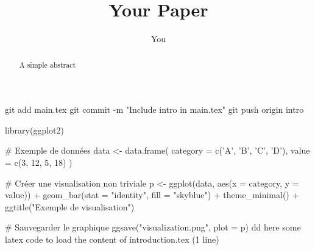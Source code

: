 \documentclass{article}
\title{Your Paper}
\author{You}
\begin{document}
\maketitle
\begin{abstract}
A simple abstract
\end{abstract}

git add main.tex
git commit -m "Include intro in main.tex"
git push origin intro


library(ggplot2)

# Exemple de données
data <- data.frame(
  category = c('A', 'B', 'C', 'D'),
  value = c(3, 12, 5, 18)
)

# Créer une visualisation non triviale
p <- ggplot(data, aes(x = category, y = value)) +
  geom_bar(stat = "identity", fill = "skyblue") +
  theme_minimal() +
  ggtitle("Exemple de visualisation")

# Sauvegarder le graphique
ggsave("visualization.png", plot = p)
dd here some latex code to load the content of  introduction.tex (1 line)	




\end{document}
